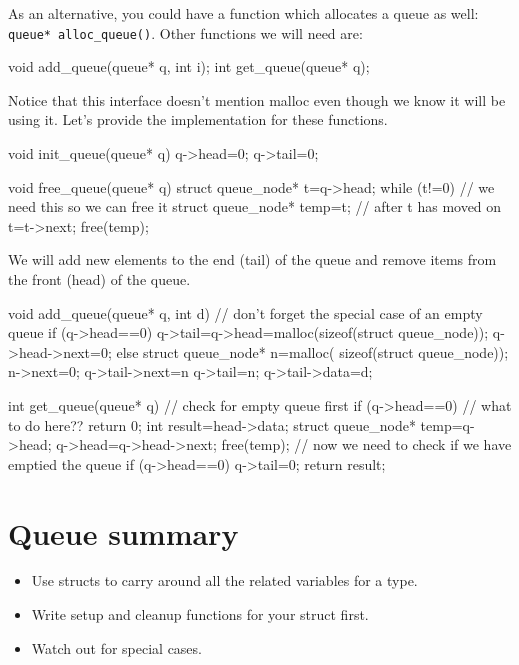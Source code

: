 As an alternative, you could have a function which allocates a queue as well: \lstinline!queue* alloc_queue()!.
Other functions we will need are:
\begin{codeinline}
void add_queue(queue* q, int i);
int get_queue(queue* q);
\end{codeinline}

Notice that this interface doesn't mention malloc even though we know it will be using it.
Let's provide the implementation for these functions.
\begin{codeblock}
void init_queue(queue* q) {
    q->head=0;
    q->tail=0;
}

void free_queue(queue* q) {
    struct queue_node* t=q->head;
    while (t!=0) {
	    // we need this so we can free it
        struct queue_node* temp=t; // after t has moved on
        t=t->next;		
        free(temp);
    }
}
\end{codeblock}

We will add new elements to the end (tail) of the queue and remove items from the front (head) of the queue.
\begin{codeblock}
void add_queue(queue* q, int d) {
      // don't forget the special case of an empty queue
    if (q->head==0) {	
        q->tail=q->head=malloc(sizeof(struct queue_node));
        q->head->next=0;
    } else {
	struct queue_node* n=malloc(
	    sizeof(struct queue_node));
	n->next=0;
	q->tail->next=n
	q->tail=n;
    }
    q->tail->data=d;
}

int get_queue(queue* q) {
	// check for empty queue first
    if (q->head==0) {
	  // what to do here??
	return 0;
    }
    int result=head->data;
    struct queue_node* temp=q->head;
    q->head=q->head->next;
    free(temp);
      // now we need to check if we have emptied the queue
    if (q->head==0) {
        q->tail=0;
    }
    return result;
}

\end{codeblock}









\section*{Queue summary}
\begin{itemize}
 \item Use structs to carry around all the related variables for a type.
 \item Write setup and cleanup functions for your struct first.
 \item Watch out for special cases.
\end{itemize}

